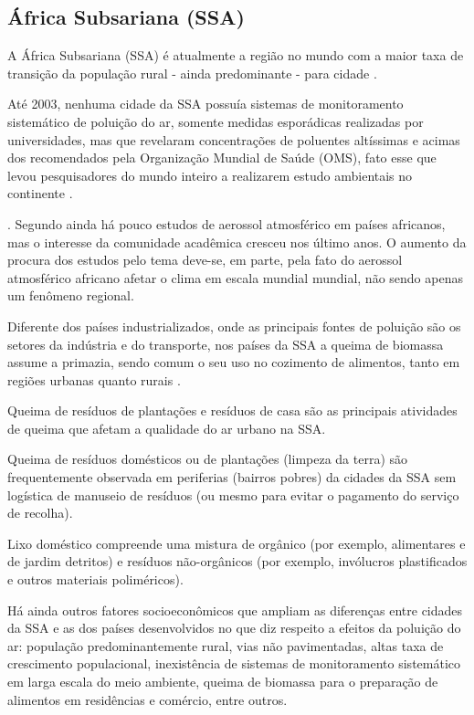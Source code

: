    	
\subsection{África Subsariana (SSA)}

A África Subsariana (SSA) é atualmente a região no mundo com a maior 
taxa de transição da população rural - ainda predominante - para cidade
\citep{MONTGOMERY2008}. 

Até 2003, nenhuma cidade da SSA possuía sistemas de monitoramento 
sistemático de poluição do ar, somente medidas esporádicas realizadas
por universidades, mas que revelaram concentrações de poluentes altíssimas e 
acimas dos recomendados pela Organização Mundial de Saúde (OMS),
fato esse que levou pesquisadores do mundo inteiro a 
realizarem estudo ambientais no continente \citep{EZZATI2004}. 

.
Segundo \cite{aboh2009} ainda há pouco estudos de aerossol atmosférico 
em países africanos, mas o interesse da comunidade acadêmica cresceu
nos último anos. O aumento da procura dos estudos pelo tema deve-se, em parte, 
pela fato do aerossol atmosférico africano afetar o clima 
em escala mundial mundial, não sendo apenas um fenômeno regional.

Diferente dos países industrializados, onde as principais fontes de poluição 
são os setores da indústria e do transporte, nos países da SSA a 
queima de biomassa assume a primazia, sendo comum o seu uso no cozimento 
de alimentos, tanto em regiões urbanas quanto rurais \citep{SMITH2004}. 

Queima de resíduos de plantações e resíduos de casa são as principais 
atividades de queima que afetam a qualidade do ar urbano  na SSA.

Queima de resíduos domésticos ou de plantações (limpeza da terra) 
são frequentemente observada em periferias (bairros pobres) da cidades da 
SSA sem logística de manuseio de 
resíduos (ou mesmo para evitar o pagamento do serviço de recolha).

Lixo doméstico compreende uma mistura de orgânico 
(por exemplo, alimentares e de jardim detritos)
e resíduos não-orgânicos (por exemplo, invólucros plastificados e
outros materiais poliméricos).

Há ainda outros fatores socioeconômicos que ampliam as diferenças entre
cidades da SSA e as dos países desenvolvidos no que diz respeito
a efeitos da poluição do ar: população predominantemente rural,
vias não pavimentadas, altas taxa de crescimento populacional,
inexistência de sistemas de monitoramento sistemático em larga escala do meio 
ambiente, queima de biomassa para o preparação de alimentos em 
residências e comércio, entre outros. 

